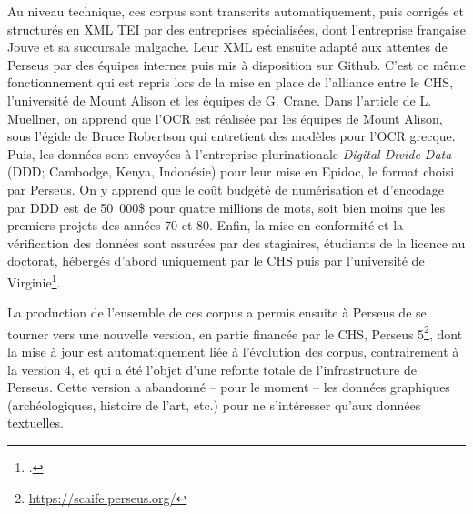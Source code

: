 Au niveau technique, ces corpus sont transcrits automatiquement, puis corrigés et structurés en XML TEI par des entreprises spécialisées, dont l'entreprise française Jouve et sa succursale malgache. Leur XML est ensuite adapté aux attentes de Perseus par des équipes internes puis mis à disposition sur Github. C'est ce même fonctionnement qui est repris lors de la mise en place de l'alliance entre le CHS, l'université de Mount Alison et les équipes de G. Crane. Dans l'article de L. Muellner, on apprend que l'OCR est réalisée par les équipes de Mount Alison, sous l'égide de Bruce Robertson qui entretient des modèles pour l'OCR grecque. Puis, les données sont envoyées à l'entreprise plurinationale \textit{Digital Divide Data} (DDD; Cambodge, Kenya, Indonésie) pour leur mise en Epidoc, le format choisi par Perseus. On y apprend que le coût budgété de numérisation et d'encodage par DDD est de 50~000\$ pour quatre millions de mots, soit bien moins que les premiers projets des années 70 et 80. Enfin, la mise en conformité et la vérification des données sont assurées par des stagiaires, étudiants de la licence au doctorat, hébergés d'abord uniquement par le CHS puis par l'université de Virginie\footcite{robertson2019optical}.

La production de l'ensemble de ces corpus a permis ensuite à Perseus de se tourner vers une nouvelle version, en partie financée par le CHS, Perseus 5\footnote{\url{https://scaife.perseus.org/}}, dont la mise à jour est automatiquement liée à l'évolution des corpus, contrairement à la version 4, et qui a été l'objet d'une refonte totale de l'infrastructure de Perseus. Cette version a abandonné -- pour le moment -- les données graphiques (archéologiques, histoire de l'art, etc.) pour ne s'intéresser qu'aux données textuelles.

